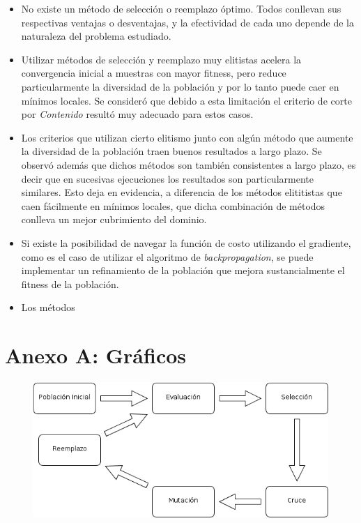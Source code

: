 \documentclass[%
    final,
    reprint,
    notitlepage,
    narroweqnarray,
    inline,
    twoside,
    invited
    ]{ieee}
\begin{document}
\begin{itemize}
\item No existe un método de selección o reemplazo óptimo. Todos conllevan sus respectivas ventajas o 
desventajas, y la efectividad de cada uno depende de la naturaleza del problema estudiado.
\item Utilizar métodos de selección y reemplazo muy elitistas acelera la convergencia inicial a muestras 
con mayor fitness, pero reduce particularmente la diversidad de la población y por lo tanto puede 
caer en mínimos locales. Se consideró que debido a esta limitación el criterio de corte por \textit{Contenido} 
resultó muy adecuado para estos casos.
\item Los criterios que utilizan cierto elitismo junto con algún método que aumente la diversidad de la población 
traen buenos resultados a largo plazo. Se observó además que dichos métodos son también consistentes a largo plazo, 
es decir que en sucesivas ejecuciones los resultados son particularmente similares. Esto deja en evidencia, a 
diferencia de los métodos elititistas que caen fácilmente en mínimos locales, que dicha combinación de métodos 
conlleva un mejor cubrimiento del dominio.
\item Si existe la posibilidad de navegar la función de costo utilizando el gradiente, como es el caso de 
utilizar el algoritmo de \textit{backpropagation}, se puede implementar un refinamiento de la población que 
mejora sustancialmente el fitness de la población.
\item Los métodos 
\end{itemize}


\clearpage
\onecolumn

\section*{Anexo A: Gráficos}


\begin{figure}[H]
\begin{center}
\includegraphics[scale=0.650]{./images/Dibujo1.png}
\label{modelado}
\end{center}
\end{figure}
\end{document}
